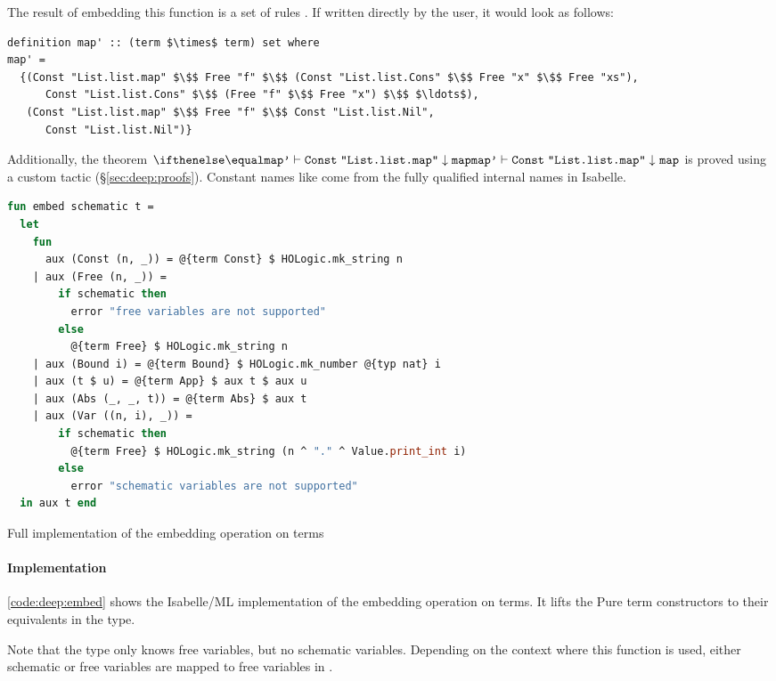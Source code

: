 \noindent
The result of embedding this function is a set of rules .
If written directly by the user, it would look as follows:
\begin{lstlisting}[basicstyle=\footnotesize\ttfamily,keywordstyle=\sffamily\bfseries\small\color{Blue}]
definition map' :: (term $\times$ term) set where
map' =
  {(Const "List.list.map" $\$$ Free "f" $\$$ (Const "List.list.Cons" $\$$ Free "x" $\$$ Free "xs"),
      Const "List.list.Cons" $\$$ (Free "f" $\$$ Free "x") $\$$ $\ldots$),
   (Const "List.list.map" $\$$ Free "f" $\$$ Const "List.list.Nil",
      Const "List.list.Nil")}
\end{lstlisting}
%
Additionally, the theorem $\evalr{\holconst{map'}}{\holconst{Const}\;\texttt{"List.list.map"}}{\holconst{map}}$ is proved using a custom tactic (§\ref{sec:deep:proofs}).
Constant names like  come from the fully qualified internal names in Isabelle.

\begin{code}
  \begin{lstlisting}[mathescape=false,language=ML]
fun embed schematic t =
  let
    fun
      aux (Const (n, _)) = @{term Const} $ HOLogic.mk_string n
    | aux (Free (n, _)) =
        if schematic then
          error "free variables are not supported"
        else
          @{term Free} $ HOLogic.mk_string n
    | aux (Bound i) = @{term Bound} $ HOLogic.mk_number @{typ nat} i
    | aux (t $ u) = @{term App} $ aux t $ aux u
    | aux (Abs (_, _, t)) = @{term Abs} $ aux t
    | aux (Var ((n, i), _)) =
        if schematic then
          @{term Free} $ HOLogic.mk_string (n ^ "." ^ Value.print_int i)
        else
          error "schematic variables are not supported"
  in aux t end
  \end{lstlisting}
  
  \caption{Full implementation of the embedding operation on terms}
  \label{code:deep:embed}
\end{code}

\paragraph{Implementation}
\cref{code:deep:embed} shows the Isabelle/ML implementation of the embedding operation on terms.
It lifts the Pure term constructors to their equivalents in the  type.

Note that the  type only knows free variables, but no schematic variables.
Depending on the context where this function is used, either schematic or free variables are mapped to free variables in .

